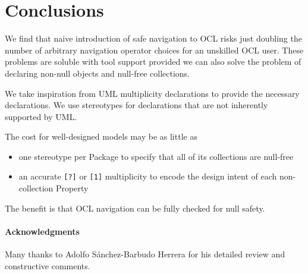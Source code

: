 \documentclass{llncs}
\begin{document}
\section{Conclusions}\label{Conclusions}
%
We find that naive introduction of safe navigation to OCL risks just doubling the number of arbitrary navigation operator choices for an unskilled OCL user. These problems are soluble with tool support provided we can also solve the problem of declaring non-null objects and null-free collections.

We take inspiration from UML multiplicity declarations to provide the necessary declarations. We use stereotypes for declarations that are not inherently supported by UML.

The cost for well-designed models may be as little as 
\begin{itemize}
\item one stereotype per Package to specify that all of its collections are null-free
\item an accurate \verb$[?]$ or \verb$[1]$ multiplicity to encode the design intent of each non-collection Property
\end{itemize}

The benefit is that OCL navigation can be fully checked for null safety.

\paragraph{Acknowledgments}

Many thanks to Adolfo S\'{a}nchez-Barbudo Herrera for his detailed review and constructive comments.
\end{document}
